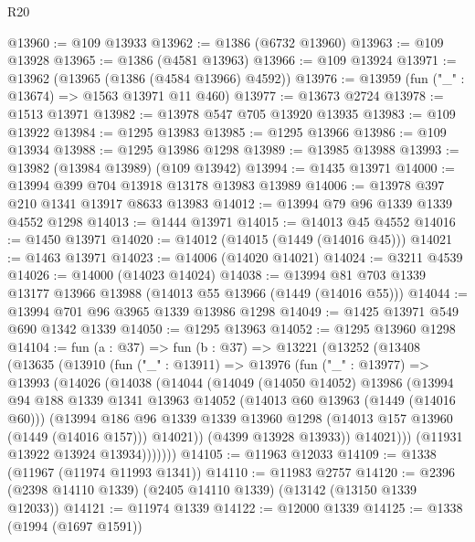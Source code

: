 \begin{lexlean}{R20}
\begin{coremodule}
@13960 := @109 @13933
@13962 := @1386 (@6732 @13960)
@13963 := @109 @13928
@13965 := @1386 (@4581 @13963)
@13966 := @109 @13924
@13971 := @13962 (@13965 (@1386 (@4584 @13966) @4592))
@13976 := @13959 (fun ("_" : @13674) => @1563 @13971 @11 @460)
@13977 := @13673 @2724
@13978 := @1513 @13971
@13982 := @13978 @547 @705 @13920 @13935
@13983 := @109 @13922
@13984 := @1295 @13983
@13985 := @1295 @13966
@13986 := @109 @13934
@13988 := @1295 @13986 @1298
@13989 := @13985 @13988
@13993 := @13982 (@13984 @13989) (@109 @13942)
@13994 := @1435 @13971
@14000 := @13994 @399 @704 @13918 @13178 @13983 @13989
@14006 := @13978 @397 @210 @1341 @13917 @8633 @13983
@14012 := @13994 @79 @96 @1339 @1339 @4552 @1298
@14013 := @1444 @13971
@14015 := @14013 @45 @4552
@14016 := @1450 @13971
@14020 := @14012 (@14015 (@1449 (@14016 @45)))
@14021 := @1463 @13971
@14023 := @14006 (@14020 @14021)
@14024 := @3211 @4539
@14026 := @14000 (@14023 @14024)
@14038 := @13994 @81 @703 @1339 @13177 @13966 @13988 (@14013 @55 @13966 (@1449 (@14016 @55)))
@14044 := @13994 @701 @96 @3965 @1339 @13986 @1298
@14049 := @1425 @13971 @549 @690 @1342 @1339
@14050 := @1295 @13963
@14052 := @1295 @13960 @1298
@14104 := fun (a : @37) =>
  fun (b : @37) =>
  @13221
    (@13252
      (@13408
        (@13635
          (@13910
            (fun ("_" : @13911) =>
            @13976
              (fun ("_" : @13977) =>
              @13993
                (@14026
                  (@14038
                    (@14044
                      (@14049
                        (@14050 @14052)
                        @13986
                        (@13994
                          @94
                          @188
                          @1339
                          @1341
                          @13963
                          @14052
                          (@14013 @60 @13963 (@1449 (@14016 @60)))
                          (@13994
                            @186
                            @96
                            @1339
                            @1339
                            @13960
                            @1298
                            (@14013 @157 @13960 (@1449 (@14016 @157)))
                            @14021))
                        (@4399 @13928 @13933))
                      @14021)))
                (@11931 @13922 @13924 @13934)))))))
@14105 := @11963 @12033
@14109 := @1338 (@11967 (@11974 @11993 @1341))
@14110 := @11983 @2757
@14120 := @2396 (@2398 @14110 @1339) (@2405 @14110 @1339) (@13142 (@13150 @1339 @12033))
@14121 := @11974 @1339
@14122 := @12000 @1339
@14125 := @1338 (@1994 (@1697 @1591))

\end{coremodule}
\end{lexlean}
